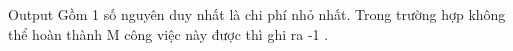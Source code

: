 Output
Gồm 1 số nguyên duy nhất là chi phí nhỏ nhất. Trong trường hợp không thể hoàn thành M công việc này được thì ghi ra -1 .